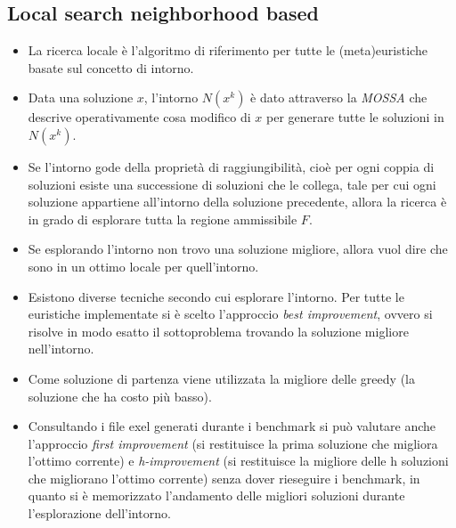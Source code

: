 \documentclass[9pt]{beamer}
\begin{document}
\subsection{Local search neighborhood based}
\begin{frame}[allowframebreaks]{\subsecname}

	\begin{itemize}
		\item
		La ricerca locale è l’algoritmo di riferimento per tutte le (meta)euristiche basate sul concetto di intorno.
		
		\item	
		Data una soluzione $x$, l’intorno $N(x^k)$ è dato attraverso la \emph{MOSSA} che descrive operativamente cosa modifico di $x$ per generare tutte le soluzioni in $N(x^k)$.

		\item
		Se l’intorno gode della proprietà di raggiungibilità, cioè per ogni coppia di soluzioni esiste una successione di soluzioni che le collega, tale per cui ogni soluzione appartiene all’intorno della soluzione precedente, allora la ricerca è in grado di esplorare tutta la regione ammissibile $F$.

		\item
		Se esplorando l’intorno non trovo una soluzione migliore, allora vuol dire che sono in un ottimo locale per quell’intorno.
	\end{itemize}

\framebreak

	\begin{itemize}
		\item
		Esistono diverse tecniche secondo cui esplorare l’intorno. Per tutte le euristiche implementate si è scelto l’approccio \emph{best improvement}, ovvero si risolve in modo esatto il sottoproblema trovando la soluzione migliore nell’intorno.

		\item
		Come soluzione di partenza viene utilizzata la migliore delle greedy (la soluzione che ha costo più basso).

		\item
		Consultando i file exel generati durante i benchmark si può valutare anche l’approccio \emph{first improvement} (si restituisce la prima soluzione che migliora l’ottimo corrente) e \emph{h-improvement} (si restituisce la migliore delle h soluzioni che migliorano l’ottimo corrente) senza dover rieseguire i benchmark, in quanto si è memorizzato l’andamento delle migliori soluzioni durante l’esplorazione dell’intorno.
	\end{itemize}

\end{frame}
\end{document}
